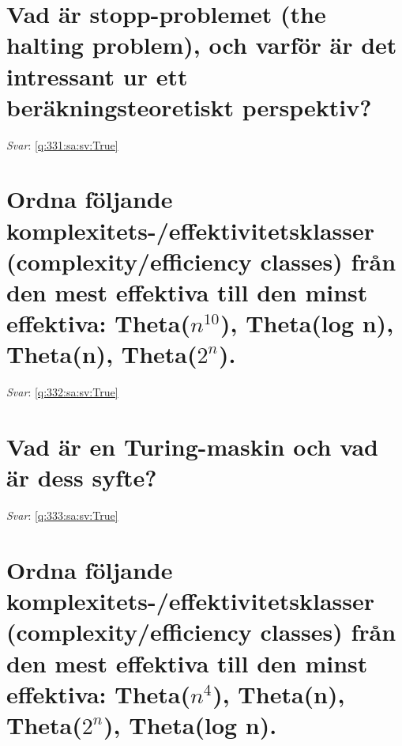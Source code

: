 \documentclass[a4paper,11pt,oneside]{book}
\begin{document}
\begin{sloppypar}
\section{Vad \"ar stopp-problemet (the halting problem), och varf\"or \"ar det intressant ur ett ber\"akningsteoretiskt perspektiv?}

\label{q:331:sa:sv:False}

\vspace{2cm}

\noindent\makebox[\textwidth]{\hrulefill}

\vspace{1cm}

\textit{Svar}: \autoref{q:331:sa:sv:True}



\section{Ordna f\"oljande komplexitets-/effektivitetsklasser (complexity/efficiency classes) fr\r{a}n den mest effektiva till den minst effektiva: Theta($n^10$), Theta(log n), Theta(n), Theta($2^n$).}

\label{q:332:sa:sv:False}

\vspace{2cm}

\noindent\makebox[\textwidth]{\hrulefill}

\vspace{1cm}

\textit{Svar}: \autoref{q:332:sa:sv:True}



\section{Vad \"ar en Turing-maskin och vad \"ar dess syfte?}

\label{q:333:sa:sv:False}

\vspace{2cm}

\noindent\makebox[\textwidth]{\hrulefill}

\vspace{1cm}

\textit{Svar}: \autoref{q:333:sa:sv:True}



\section{Ordna f\"oljande komplexitets-/effektivitetsklasser (complexity/efficiency classes) fr\r{a}n den mest effektiva till den minst effektiva: Theta($n^4$), Theta(n), Theta($2^n$), Theta(log n).}


\end{sloppypar}
\end{document}
